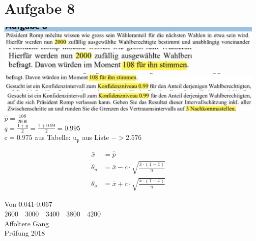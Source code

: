 \documentclass[10pt]{article}
\begin{document}
{\section*{Aufgabe 8}
\includegraphics[max width=\textwidth, center]{2024_12_29_0906b02acf849bda8665g-4(1)}\\
\includegraphics[max width=\textwidth, center]{2024_12_29_0906b02acf849bda8665g-4(10)}\\
\includegraphics[max width=\textwidth, center]{2024_12_29_0906b02acf849bda8665g-4(11)}\\
\includegraphics[max width=\textwidth]{2024_12_29_0906b02acf849bda8665g-4(8)} $\hat{p}=\frac{108}{2000}$\\
$q=\frac{1+y}{2}=\frac{1+0.99}{2}=0.995$\\
$\mathrm{c}=0.975$ aus Tabelle: $\mathrm{u}_{\mathrm{p}}$ aus Liste $->2.576$

$$
\begin{aligned}
\bar{x} & =\hat{p} \\
\theta_{u} & =\bar{x}-c \cdot \sqrt{\frac{\bar{x} \cdot(1-\bar{x})}{n}} \\
\theta_{o} & =\bar{x}+c \cdot \sqrt{\frac{\bar{x} \cdot(1-\bar{x})}{n}}
\end{aligned}
$$

Von 0.041-0.067\\
$2600 \quad 3000 \quad 3400 \quad 3800 \quad 4200$\\
Affoltere Gang\\
Prüfung 2018

}
\end{document}
